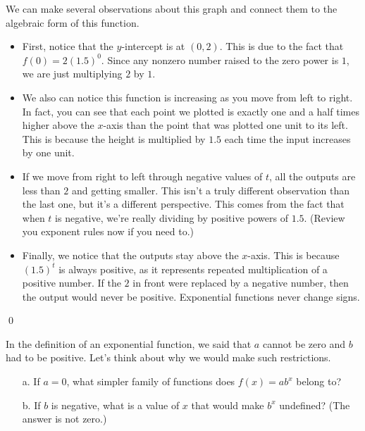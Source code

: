 \begin{eg}
\begin{eg}
We can make several observations about this graph and connect them to the algebraic form of this function. 
\begin{itemize}
\item First, notice that the $y$-intercept is at $(0,2)$. This is due to the fact that $f(0) = 2(1.5)^0$. Since any nonzero number raised to the zero power is $1$, we are just multiplying $2$ by $1$. 
\item We also can notice this function is increasing as you move from left to right. In fact, you can see that each point we plotted is exactly one and a half times higher above the $x$-axis than the point that was plotted one unit to its left. This is because the height is multiplied by $1.5$ each time the input increases by one unit. 
\item If we move from right to left through negative values of $t$, all the outputs are less than $2$ and getting smaller. This isn't a truly different observation than the last one, but it's a different perspective. This comes from the fact that when $t$ is negative, we're really dividing by positive powers of $1.5$. (Review you exponent rules now if you need to.)
\item Finally, we notice that the outputs stay above the $x$-axis. This is because $(1.5)^t$ is always positive, as it represents repeated multiplication of a positive number. If the $2$ in front were replaced by a negative number, then the output would never be positive. Exponential functions never change signs.
\end{itemize}\qed \end{eg}

\begin{question} In the definition of an exponential function, we said that $a$ cannot be zero and $b$ had to be positive. Let's think about why we would make such restrictions.
\begin{enumerate}
\item[a.] If $a=0$, what simpler family of functions does $f(x) = ab^x$ belong to?
\item[b.] If $b$ is negative, what is a value of $x$ that would make $b^{x}$ undefined? (The answer is not zero.)
\end{enumerate} 
\end{question}


\end{eg}
